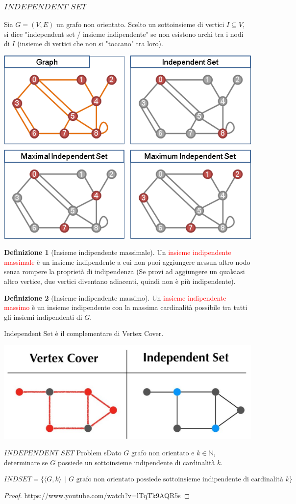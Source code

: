 \documentclass{article}  %
\theoremstyle{definition}
\newtheorem{definition}{Definizione}[section]
\begin{document}
\subsubsection{$INDEPENDENT$ $SET$}
Sia $G=(V,E)$ un grafo non orientato. Scelto un sottoinsieme di vertici $I \subseteq V$, si dice "independent set / insieme indipendente" se non esistono archi tra i nodi di $I$
(insieme di vertici che non si "toccano" tra loro).
\begin{center}
	\includegraphics[width=0.6\linewidth]{indipendent-set.png}
\end{center}
\begin{definition}[Insieme indipendente massimale]
	Un \textcolor{red}{insieme indipendente massimale} è un insieme indipendente a cui non puoi aggiungere nessun altro nodo senza rompere la proprietà di indipendenza
	(Se provi ad aggiungere un qualsiasi altro vertice, due vertici diventano adiacenti, quindi non è più indipendente).
\end{definition}
\begin{definition}[Insieme indipendente massimo]
	Un \textcolor{red}{insieme indipendente massimo} è un insieme indipendente con la massima cardinalità possibile tra tutti gli insiemi indipendenti di $G$.
\end{definition}
\begin{osservazioni}[Osservazioni]
	Independent Set è il complementare di Vertex Cover.
	\begin{center}
		\includegraphics[width=0.5\linewidth]{vc-indset.png}
	\end{center}
\end{osservazioni}
\begin{theorem}{$INDEPENDENT$ $SET$ Problem}
	sDato $G$ grafo non orientato e $k \in \mathbb{N}$, determinare se $G$ possiede un sottoinsieme indipendente di cardinalità $k$.
	\footnotesize
	\begin{center}
		$INDSET=\{\langle G,k \rangle\ \mid G \text{ grafo non orientato possiede sottoinsieme indipendente di cardinalità } k\}$
	\end{center}
	\begin{proof}
		https://www.youtube.com/watch?v=lTqTk9AQR5s
	\end{proof}
\end{theorem}
\end{document}
